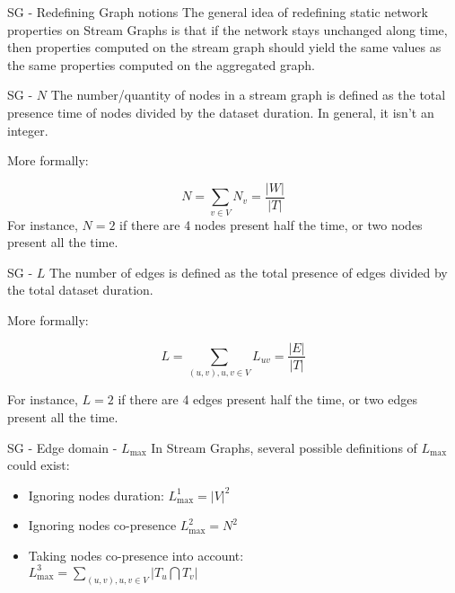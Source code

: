 \begin{textbox}{SG - Redefining Graph notions}
    The general idea of redefining static network properties on Stream Graphs is that if the network stays unchanged along time, then properties computed on the stream graph should yield the same values as the same properties computed on the aggregated graph.
\end{textbox}


\begin{textbox}{SG - $N$}
    The number/quantity of nodes in a stream graph is defined as the total presence time of nodes divided by the dataset duration. In general, it isn't an integer.

    More formally:

    \[
        N=\sum_{v\in V} N_v = \frac{|W|}{|T|}
    \]
    For instance, $N=2$ if there are 4 nodes present half the time, or two nodes present all the time.
\end{textbox}


\begin{textbox}{SG - $L$}
    The number of edges is defined as the total presence of edges divided by the total dataset duration.

    More formally:

    \[
        L=\sum_{(u,v),u,v \in V} L_{uv}=\frac{|E|}{|T|}
    \]

    For instance, $L=2$ if there are 4 edges present half the time, or two edges present all the time.
\end{textbox}


\begin{textbox}{SG - Edge domain - $L_{\max}$}
    In Stream Graphs, several possible definitions of ${L_{\max}}$ could exist:
    \begin{itemize}
        \item Ignoring nodes duration: ${L_{\max}^1}=|V|^2$
        \item Ignoring nodes co-presence ${L_{\max}^2}=N^2$
        \item Taking nodes co-presence into account:  \\ ${L_{\max}^3}=\sum_{(u,v),u,v \in V}|T_u \bigcap T_v|$
    \end{itemize}

\end{textbox}


